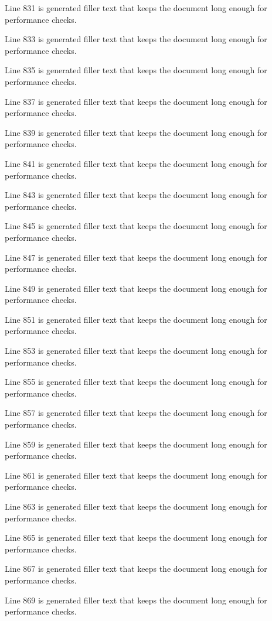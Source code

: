 Line 831 is generated filler text that keeps the document long enough for performance checks.

Line 833 is generated filler text that keeps the document long enough for performance checks.

Line 835 is generated filler text that keeps the document long enough for performance checks.

Line 837 is generated filler text that keeps the document long enough for performance checks.

Line 839 is generated filler text that keeps the document long enough for performance checks.

Line 841 is generated filler text that keeps the document long enough for performance checks.

Line 843 is generated filler text that keeps the document long enough for performance checks.

Line 845 is generated filler text that keeps the document long enough for performance checks.

Line 847 is generated filler text that keeps the document long enough for performance checks.

Line 849 is generated filler text that keeps the document long enough for performance checks.

Line 851 is generated filler text that keeps the document long enough for performance checks.

Line 853 is generated filler text that keeps the document long enough for performance checks.

Line 855 is generated filler text that keeps the document long enough for performance checks.

Line 857 is generated filler text that keeps the document long enough for performance checks.

Line 859 is generated filler text that keeps the document long enough for performance checks.

Line 861 is generated filler text that keeps the document long enough for performance checks.

Line 863 is generated filler text that keeps the document long enough for performance checks.

Line 865 is generated filler text that keeps the document long enough for performance checks.

Line 867 is generated filler text that keeps the document long enough for performance checks.

Line 869 is generated filler text that keeps the document long enough for performance checks.

